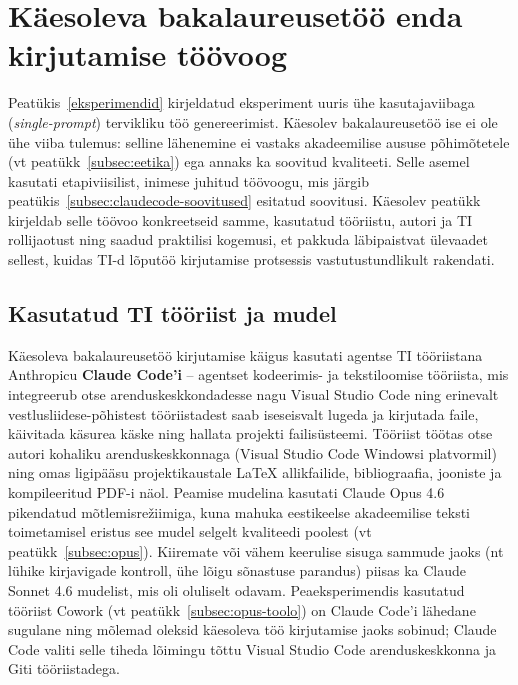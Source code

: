 \section{Käesoleva bakalaureusetöö enda kirjutamise töövoog} \label{toovoog}

Peatükis~\ref{eksperimendid} kirjeldatud eksperiment uuris ühe kasutajaviibaga (\textit{single-prompt}) tervikliku töö genereerimist. Käesolev bakalaureusetöö ise ei ole ühe viiba tulemus: selline lähenemine ei vastaks akadeemilise aususe põhimõtetele (vt peatükk~\ref{subsec:eetika}) ega annaks ka soovitud kvaliteeti. Selle asemel kasutati etapiviisilist, inimese juhitud töövoogu, mis järgib peatükis~\ref{subsec:claudecode-soovitused} esitatud soovitusi. Käesolev peatükk kirjeldab selle töövoo konkreetseid samme, kasutatud tööriistu, autori ja TI rollijaotust ning saadud praktilisi kogemusi, et pakkuda läbipaistvat ülevaadet sellest, kuidas TI-d lõputöö kirjutamise protsessis vastutustundlikult rakendati.

\subsection{Kasutatud TI tööriist ja mudel} \label{subsec:tooriist-mudel}

Käesoleva bakalaureusetöö kirjutamise käigus kasutati agentse TI tööriistana Anthropicu \textbf{Claude Code'i} -- agentset kodeerimis- ja tekstiloomise tööriista, mis integreerub otse arenduskeskkondadesse nagu Visual Studio Code \cite{anthropic2026claudecode} ning erinevalt vestlusliidese-põhistest tööriistadest saab iseseisvalt lugeda ja kirjutada faile, käivitada käsurea käske ning hallata projekti failisüsteemi. Tööriist töötas otse autori kohaliku arenduskeskkonnaga (Visual Studio Code Windowsi platvormil) ning omas ligipääsu projektikaustale \LaTeX{} allikfailide, bibliograafia, jooniste ja kompileeritud PDF-i näol. Peamise mudelina kasutati Claude Opus 4.6 pikendatud mõtlemisrežiimiga, kuna mahuka eestikeelse akadeemilise teksti toimetamisel eristus see mudel selgelt kvaliteedi poolest (vt peatükk~\ref{subsec:opus}). Kiiremate või vähem keerulise sisuga sammude jaoks (nt lühike kirjavigade kontroll, ühe lõigu sõnastuse parandus) piisas ka Claude Sonnet 4.6 mudelist, mis oli oluliselt odavam. Peaeksperimendis kasutatud tööriist Cowork (vt peatükk~\ref{subsec:opus-toolo}) on Claude Code'i lähedane sugulane ning mõlemad oleksid käesoleva töö kirjutamise jaoks sobinud; Claude Code valiti selle tiheda lõimingu tõttu Visual Studio Code arenduskeskkonna ja Giti tööriistadega.

